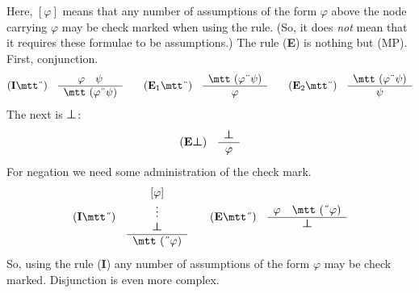Here, $[\varphi]$ means that any number of assumptions of the form
$\varphi$ above the node carrying $\varphi$ may be check marked
when using the rule. (So, it does {\it not\/} mean that it
requires these formulae to be assumptions.) The rule 
(\textbf{E}{\mtt{}}) is nothing but (MP). First, conjunction.
\begin{equation}
\mbox{\rm (\textbf{I}{\mtt\symbol{4}})}\quad\begin{array}{c}
\varphi \quad\psi \\\hline
\mbox{\mtt ($\varphi$\symbol{4}$\psi$)}
\end{array}
\qquad
\mbox{\rm (\textbf{E}$_1${\mtt\symbol{4}})}\quad
\begin{array}{c}
\mbox{\mtt ($\varphi$\symbol{4}$\psi$)} \\\hline
\varphi
\end{array}\qquad
\mbox{\rm (\textbf{E}$_2${\mtt\symbol{4}})}\quad
\begin{array}{c}
\mbox{\mtt ($\varphi$\symbol{4}$\psi$)} \\\hline
\psi
\end{array}
\end{equation}
The next is $\boldsymbol{\bot}$:
\begin{equation}
\mbox{\rm (\textbf{E}$\boldsymbol{\bot}$)}\quad\begin{array}{c}
    \boldsymbol{\bot} \\\hline
    \varphi
    \end{array}
\end{equation}
For negation we need some administration of the check mark.
\begin{equation}
\mbox{\rm (\textbf{I}{\mtt\symbol{5}})}\quad
\begin{array}{c}
[\varphi] \\
\vdots \\
\sbot \\\hline
\mbox{\mtt (\symbol{5}$\varphi$)}
\end{array}
\qquad
\mbox{\rm (\textbf{E}{\mtt\symbol{5}})}\quad
\begin{array}{c}
\varphi \quad\mbox{\mtt (\symbol{5}$\varphi$)} \\\hline
\sbot
\end{array}
\end{equation}
So, using the rule (\textbf{I}{\mtt{}}) any number of assumptions 
of the form $\varphi$ may be check marked.
Disjunction is even more complex.
